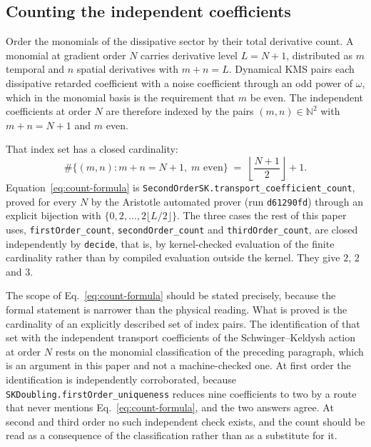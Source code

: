 \documentclass[aps,prd,reprint,nofootinbib,superscriptaddress]{revtex4-2}
\begin{document}
\subsection{Counting the independent coefficients}
\label{sec:higher-count}

Order the monomials of the dissipative sector by their total derivative
count. A monomial at gradient order $N$ carries derivative level
$L = N+1$, distributed as $m$ temporal and $n$ spatial derivatives with
$m + n = L$. Dynamical KMS pairs each dissipative retarded coefficient
with a noise coefficient through an odd power of $\omega$, which in the
monomial basis is the requirement that $m$ be even. The independent
coefficients at order $N$ are therefore indexed by the pairs
$(m,n) \in \mathbb{N}^2$ with $m + n = N+1$ and $m$ even.

That index set has a closed cardinality:
\begin{equation}
\#\{(m,n) : m+n = N+1,\; m \text{ even}\}
  \;=\; \left\lfloor \frac{N+1}{2} \right\rfloor + 1 .
\label{eq:count-formula}
\end{equation}
Equation~\eqref{eq:count-formula} is
\texttt{SecondOrderSK.transport\_coefficient\_count}, proved for every
$N$ by the Aristotle automated prover (run \texttt{d61290fd}) through an
explicit bijection with $\{0, 2, \ldots, 2\lfloor L/2\rfloor\}$. The
three cases the rest of this paper uses,
\texttt{firstOrder\_count}, \texttt{secondOrder\_count} and
\texttt{thirdOrder\_count}, are closed independently by
\texttt{decide}, that is, by kernel-checked evaluation of the finite
cardinality rather than by compiled evaluation outside the kernel. They
give $2$, $2$ and $3$.

The scope of Eq.~\eqref{eq:count-formula} should be stated precisely,
because the formal statement is narrower than the physical reading. What
is proved is the cardinality of an explicitly described set of index
pairs. The identification of that set with the independent transport
coefficients of the Schwinger--Keldysh action at order $N$ rests on the
monomial classification of the preceding paragraph, which is an argument
in this paper and not a machine-checked one. At first order the
identification is independently corroborated, because
\texttt{SKDoubling.firstOrder\_uniqueness} reduces nine coefficients to
two by a route that never mentions Eq.~\eqref{eq:count-formula}, and the
two answers agree. At second and third order no such independent check
exists, and the count should be read as a consequence of the
classification rather than as a substitute for it.
\end{document}
